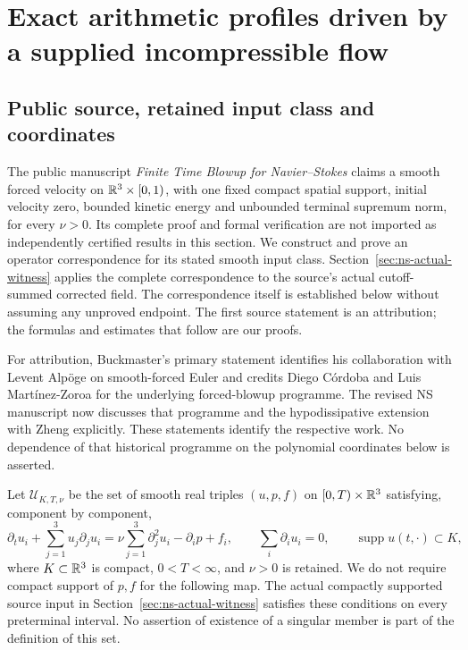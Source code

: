 \section{Exact arithmetic profiles driven by a supplied incompressible flow}
\label{sec:ns-full-flow}

\subsection{Public source, retained input class and coordinates}

The public manuscript \emph{Finite Time Blowup for Navier--Stokes}
\cite[Theorem 1.1]{openaiNS2026release} claims a smooth forced velocity on
$\mathbb R^3\times[0,1)$, with one fixed compact spatial support, initial
velocity zero, bounded kinetic energy and unbounded terminal supremum
norm, for every $\nu>0$. Its complete proof and formal verification are
not imported as independently certified results in this section. We
construct and prove an operator correspondence for its stated smooth
input class. Section~\ref{sec:ns-actual-witness} applies the complete
correspondence to the source's actual cutoff-summed corrected field.
The correspondence itself is established
below without assuming any unproved endpoint. The first source statement
is an attribution; the formulas and estimates that follow are our proofs.

For attribution, Buckmaster's primary statement
\cite[p.~1]{buckmasterStatement2026} identifies his collaboration with
Levent Alp\"oge on smooth-forced Euler and credits Diego C\'ordoba and
Luis Mart\'inez-Zoroa for the underlying forced-blowup programme.
The revised NS manuscript \cite[pp.~2--3]{openaiNS2026release} now discusses
that programme and the hypodissipative extension with Zheng explicitly.
These statements identify the respective work. No dependence of that
historical programme on the polynomial coordinates below is asserted.

Let $\mathcal U_{K,T,\nu}$ be the set of smooth real triples $(u,p,f)$
on $[0,T)\times\mathbb R^3$ satisfying, component by component,
\begin{equation}
 \partial_tu_i+\sum_{j=1}^3u_j\partial_ju_i
 =\nu\sum_{j=1}^3\partial_j^2u_i-\partial_ip+f_i,
 \qquad \sum_i\partial_i u_i=0,
 \qquad \operatorname{supp}u(t,\cdot)\subset K,
 \label{nfl:input}
\end{equation}
where $K\subset\mathbb R^3$ is compact, $0<T<\infty$, and $\nu>0$ is retained.
We do not require compact support of $p,f$ for the following map. The
actual compactly supported source input in
Section~\ref{sec:ns-actual-witness} satisfies these conditions on every
preterminal interval. No assertion of existence of
a singular member is part of the definition of this set.

